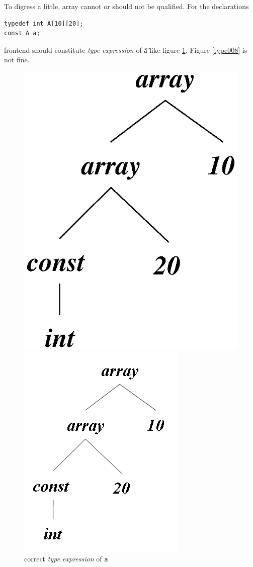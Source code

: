 To digress a little, array cannot or should not be qualified.
For the declarations
\begin{verbatim}
typedef int A[10][20];
const A a;
\end{verbatim}
frontend should constitute {\em type expression} of {\t{a}}
like figure \ref{type007}. Figure \ref{type008} is not fine.
\begin{figure}[htbp]
\begin{center}
\begin{latexonly}
\includegraphics[width=0.4\linewidth,height=0.5\linewidth]{correct_array.eps}
\end{latexonly}
\begin{htmlonly}
\includegraphics{correct_array.png}
\end{htmlonly}
\caption{correct {\em type expression} of {\tt{a}}}
\label{type007}
\end{center}
\end{figure}
